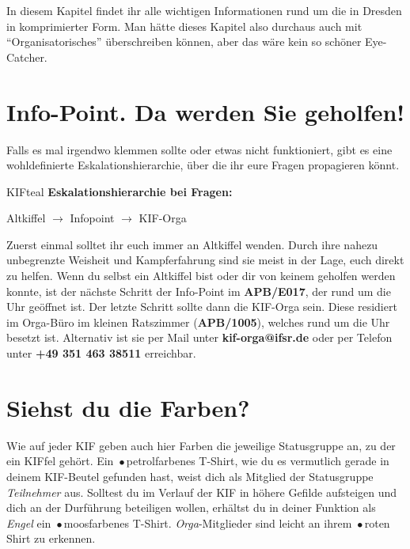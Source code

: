 
In diesem Kapitel findet ihr alle wichtigen Informationen rund um die \KIF{} in Dresden in komprimierter Form.
Man hätte dieses Kapitel also durchaus auch mit ``Organisatorisches'' überschreiben können, aber das wäre kein so schöner Eye-Catcher.

\section*{Info-Point. Da werden Sie geholfen!}

Falls es mal irgendwo klemmen sollte oder etwas nicht funktioniert, gibt es eine wohldefinierte Eskalationshierarchie, über die ihr eure Fragen propagieren könnt.

\begin{awesomeblock}[KIFteal]{2pt}{\faQuestion}{KIFteal}
    \textbf{Eskalationshierarchie bei Fragen:}

  Altkiffel $\longrightarrow$ Infopoint $\longrightarrow$ KIF-Orga
\end{awesomeblock}

Zuerst einmal solltet ihr euch immer an Altkiffel wenden.
Durch ihre nahezu unbegrenzte Weisheit und Kampferfahrung sind sie meist in der Lage, euch direkt zu helfen.
Wenn du selbst ein Altkiffel bist oder dir von keinem geholfen werden konnte, ist der nächste Schritt der Info-Point im \textbf{APB/E017}, der rund um die Uhr geöffnet ist.
Der letzte Schritt sollte dann die KIF-Orga sein.
Diese residiert im Orga-Büro im kleinen Ratszimmer (\textbf{APB/1005}), welches rund um die Uhr besetzt ist.
Alternativ ist sie per Mail unter \textbf{kif-orga@ifsr.de} oder per Telefon unter \textbf{+49 351 463 38511} erreichbar.

\section*{Siehst du die Farben?}

Wie auf jeder KIF geben auch hier Farben die jeweilige Statusgruppe an, zu der ein KIFfel gehört.
Ein {\,\color{ShirtAttendee}$\bullet$\,}petrolfarbenes T-Shirt, wie du es vermutlich gerade in deinem KIF-Beutel gefunden hast, weist dich als Mitglied der Statusgruppe \emph{Teilnehmer} aus.
Solltest du im Verlauf der KIF in höhere Gefilde aufsteigen und dich an der Durführung beteiligen wollen, erhältst du in deiner Funktion als \emph{Engel} ein {\,\color{ShirtAngel}$\bullet$\,}moosfarbenes T-Shirt.
\emph{Orga}-Mitglieder sind leicht an ihrem {\,\color{ShirtOrga}$\bullet$\,}roten Shirt zu erkennen.

